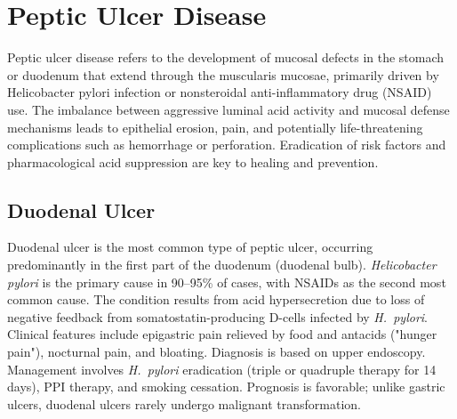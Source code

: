 \section{Peptic Ulcer Disease}




Peptic ulcer disease refers to the development of mucosal defects in the stomach or duodenum that extend through the muscularis mucosae, primarily driven by Helicobacter pylori infection or nonsteroidal anti-inflammatory drug (NSAID) use. The imbalance between aggressive luminal acid activity and mucosal defense mechanisms leads to epithelial erosion, pain, and potentially life-threatening complications such as hemorrhage or perforation. Eradication of risk factors and pharmacological acid suppression are key to healing and prevention.





\label{sec:section:Peptic Ulcer Disease}

\subsection{Duodenal Ulcer}
\label{sec:Duodenal Ulcer}
Duodenal ulcer is the most common type of peptic ulcer, occurring predominantly in the first part of the duodenum (duodenal bulb). \textit{Helicobacter pylori} is the primary cause in 90--95\% of cases, with NSAIDs as the second most common cause. The condition results from acid hypersecretion due to loss of negative feedback from somatostatin-producing D-cells infected by \textit{H.~pylori}. Clinical features include epigastric pain relieved by food and antacids ("hunger pain"), nocturnal pain, and bloating. Diagnosis is based on upper endoscopy. Management involves \textit{H.~pylori} eradication (triple or quadruple therapy for 14 days), PPI therapy, and smoking cessation. Prognosis is favorable; unlike gastric ulcers, duodenal ulcers rarely undergo malignant transformation.


